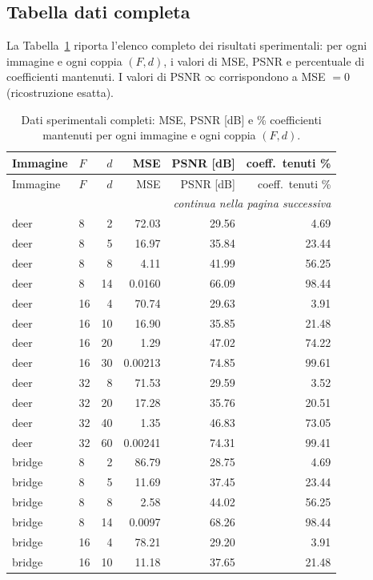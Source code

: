 \documentclass[11pt,a4paper]{article}
\begin{document}
\subsection{Tabella dati completa}\label{sec:dati}

La Tabella~\ref{tab:dati} riporta l'elenco completo dei risultati sperimentali:
per ogni immagine e ogni coppia $(F,d)$, i valori di MSE, PSNR e percentuale di
coefficienti mantenuti. I valori di PSNR $\infty$ corrispondono a MSE $=0$
(ricostruzione esatta).

\begin{longtable}{llrrrr}
\caption{Dati sperimentali completi: MSE, PSNR [dB] e \% coefficienti mantenuti
per ogni immagine e ogni coppia $(F,d)$.}\label{tab:dati}\\
\toprule
Immagine & $F$ & $d$ & MSE & PSNR [dB] & coeff.\ tenuti \% \\
\midrule
\endfirsthead
\toprule
Immagine & $F$ & $d$ & MSE & PSNR [dB] & coeff.\ tenuti \% \\
\midrule
\endhead
\midrule
\multicolumn{6}{r}{\textit{continua nella pagina successiva}} \\
\endfoot
\bottomrule
\endlastfoot
deer & 8 & 2 & 72.03 & 29.56 & 4.69 \\
deer & 8 & 5 & 16.97 & 35.84 & 23.44 \\
deer & 8 & 8 & 4.11 & 41.99 & 56.25 \\
deer & 8 & 14 & 0.0160 & 66.09 & 98.44 \\
deer & 16 & 4 & 70.74 & 29.63 & 3.91 \\
deer & 16 & 10 & 16.90 & 35.85 & 21.48 \\
deer & 16 & 20 & 1.29 & 47.02 & 74.22 \\
deer & 16 & 30 & 0.00213 & 74.85 & 99.61 \\
deer & 32 & 8 & 71.53 & 29.59 & 3.52 \\
deer & 32 & 20 & 17.28 & 35.76 & 20.51 \\
deer & 32 & 40 & 1.35 & 46.83 & 73.05 \\
deer & 32 & 60 & 0.00241 & 74.31 & 99.41 \\
bridge & 8 & 2 & 86.79 & 28.75 & 4.69 \\
bridge & 8 & 5 & 11.69 & 37.45 & 23.44 \\
bridge & 8 & 8 & 2.58 & 44.02 & 56.25 \\
bridge & 8 & 14 & 0.0097 & 68.26 & 98.44 \\
bridge & 16 & 4 & 78.21 & 29.20 & 3.91 \\
bridge & 16 & 10 & 11.18 & 37.65 & 21.48 \\

\end{longtable}
\end{document}
